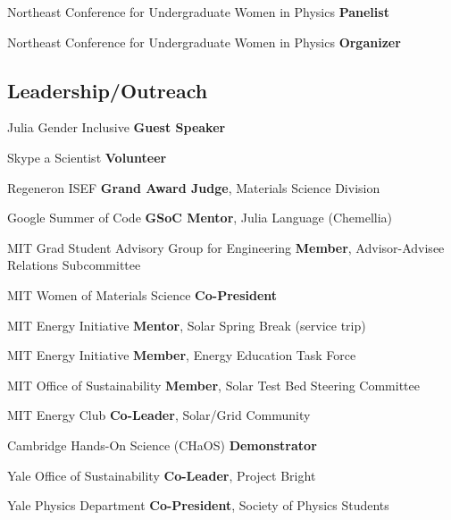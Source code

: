 {Northeast Conference for Undergraduate Women in Physics}
{\textbf{Panelist}}
{}

{Northeast Conference for Undergraduate Women in Physics}
{\textbf{Organizer}}
{}

\subsection{Leadership/Outreach}

{Julia Gender Inclusive}
{\textbf{Guest Speaker}}
{}

{Skype a Scientist}
{\textbf{Volunteer}}
{}

{Regeneron ISEF}
{\textbf{Grand Award Judge}, Materials Science Division}
{}

{Google Summer of Code}
{\textbf{GSoC Mentor}, Julia Language (Chemellia)}
{}

{MIT Grad Student Advisory Group for Engineering}
{\textbf{Member}, Advisor-Advisee Relations Subcommittee}
{}

{MIT Women of Materials Science}
{\textbf{Co-President}}
{}

{MIT Energy Initiative}
{\textbf{Mentor}, Solar Spring Break (service trip)}
{}

{MIT Energy Initiative}
{\textbf{Member}, Energy Education Task Force}
{}

{MIT Office of Sustainability}
{\textbf{Member}, Solar Test Bed Steering Committee}
{}

{MIT Energy Club}
{\textbf{Co-Leader}, Solar/Grid Community}
{}

{Cambridge Hands-On Science (CHaOS)}
{\textbf{Demonstrator}}
{}

{Yale Office of Sustainability}
{\textbf{Co-Leader}, Project Bright}
{}

{Yale Physics Department}
{\textbf{Co-President}, Society of Physics Students}
{}